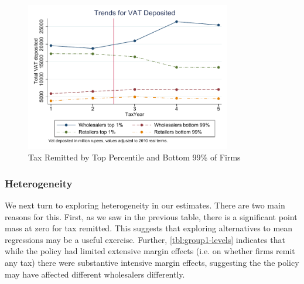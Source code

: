 
\begin{figure}[t] 
\includegraphics[width=0.8\textwidth]{graphs/MoneyDepositedTrendsTopPercentilePanel_Annual_Real.pdf}
\caption{Tax Remitted by Top Percentile and Bottom 99\% of Firms}
\label{fig:money-onepercentile}
\end{figure}

\subsubsection{Heterogeneity}
\label{subsubsec:diffindiff_heterogeneity}
We next turn to exploring heterogeneity in our estimates. There are two main reasons for this. First, as we saw in the previous table, there is a significant point mass at zero for tax remitted. This suggests that exploring alternatives to mean regressions may be a useful exercise. Further, \cref{tbl:group1-levels} indicates that while the policy had limited extensive margin effects (i.e. on whether firms remit any tax) there were substantive intensive margin effects, suggesting the the policy may have affected different wholesalers differently.


